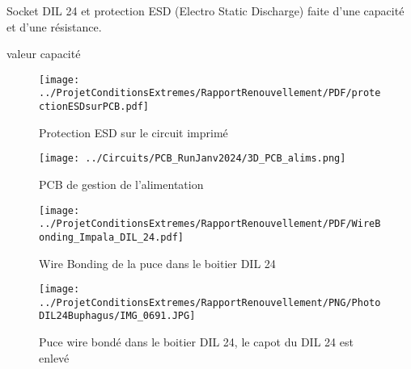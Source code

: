 Socket DIL 24 et protection ESD (Electro Static Discharge) faite d'une capacité et d'une résistance.
\begin{metsUneSource}
valeur capacité
\end{metsUneSource}

\begin{figure}
    \centering
    \texttt{[image: ../ProjetConditionsExtremes/RapportRenouvellement/PDF/protectionESDsurPCB.pdf]}
    \caption{Protection ESD sur le circuit imprimé}
    \label{fig:protection_ESD_sur_PCB} 
\end{figure}

\begin{figure}
    \centering
    \texttt{[image: ../Circuits/PCB\_RunJanv2024/3D\_PCB\_alims.png]}
    \caption{PCB de gestion de l'alimentation}
    \label{fig:PCB_alimsBuphagus}
\end{figure}

\begin{figure}
    \centering
    \texttt{[image: ../ProjetConditionsExtremes/RapportRenouvellement/PDF/WireBonding\_Impala\_DIL\_24.pdf]}
    \caption{Wire Bonding de la puce dans le boitier DIL 24}
    \label{fig:WB_Buphagus}
\end{figure}

\begin{figure}
    \centering
    \texttt{[image: ../ProjetConditionsExtremes/RapportRenouvellement/PNG/PhotoDIL24Buphagus/IMG\_0691.JPG]}
    \caption{Puce wire bondé dans le boitier DIL 24, le capot du DIL 24 est enlevé}
    \label{fig:puce_Buphagus_noLid}
\end{figure}